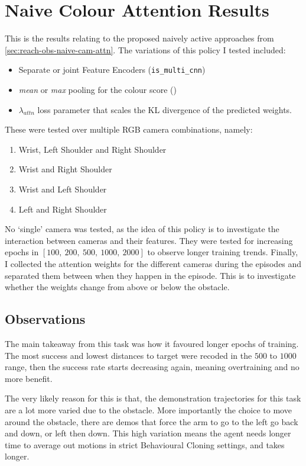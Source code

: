 \section{Naive Colour Attention Results}
This is the results relating to the proposed naively active approaches from \ref{sec:reach-obs-naive-cam-attn}.
The variations of this policy I tested included: 
\begin{itemize}
  \item Separate or joint Feature Encoders (\verb|is_multi_cnn|)
  \item \emph{mean} or \emph{max} pooling for the colour score (\verb||)
  \item $\lambda_{attn}$ loss parameter that scales the KL divergence of the predicted 
  weights.
\end{itemize}
These were tested over multiple RGB camera combinations, namely:
\begin{enumerate}
  \item Wrist, Left Shoulder and Right Shoulder
  \item Wrist and Right Shoulder
  \item Wrist and Left Shoulder
  \item Left and Right Shoulder
\end{enumerate}
No `single' camera was tested, as the idea of this policy is to investigate the interaction between cameras and their features. They were tested for increasing epochs in \(\left[100, ~200, ~500, ~1000, ~2000\right]\) to observe longer training trends. Finally, I collected the attention weights for the different cameras during the episodes and separated them between when they happen in the episode. This is to investigate whether the weights change from above or below the obstacle.


\subsection{Observations}
The main takeaway from this task was how it favoured longer epochs of training. The most success and lowest distances to target were recoded in the $500$ to $1000$ range, then the success rate starts decreasing again, meaning overtraining and no more benefit.\todo[color=purple]{}

The very likely reason for this is that, the demonstration trajectories for this task are a lot more varied due to the obstacle. More importantly the choice to move around the obstacle, there are demos that force the arm to go to the left go back and down, or left then down. This high variation means the agent needs longer time to average out motions in strict Behavioural Cloning settings, and takes longer.


